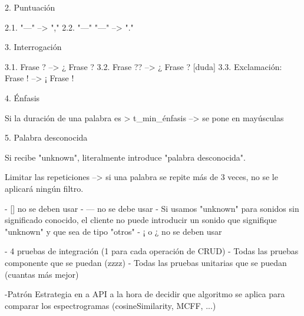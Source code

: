 2. Puntuación

    2.1. "---" --> ","
    2.2. "---" "---" --> "."

3. Interrogación

    3.1. Frase ? --> ¿ Frase ?
    3.2. Frase ?? --> ¿ Frase ? [duda]
    3.3. Exclamación: Frase ! --> ¡ Frase !

4. Énfasis

    Si la duración de una palabra es > t_min_énfasis --> se pone en mayúsculas

5. Palabra desconocida

    Si recibe "unknown", literalmente introduce "palabra desconocida".

Limitar las repeticiones --> si una palabra se repite más de 3 veces, no se le aplicará ningún filtro. 




- [] no se deben usar
- ---  no se debe usar 
- Si usamos "unknown" para sonidos sin significado conocido, el cliente no puede introducir un sonido que signifique "unknown" y que sea de tipo "otros"
- ¡ o ¿ no se deben usar



- 4 pruebas de integración (1 para cada operación de CRUD) 
- Todas las pruebas componente que se puedan (zzzz)
- Todas las pruebas unitarias que se puedan (cuantas más mejor)




-Patrón Estrategia en a API a la hora de decidir que algoritmo se aplica para
comparar los espectrogramas (cosineSimilarity, MCFF, ...)

